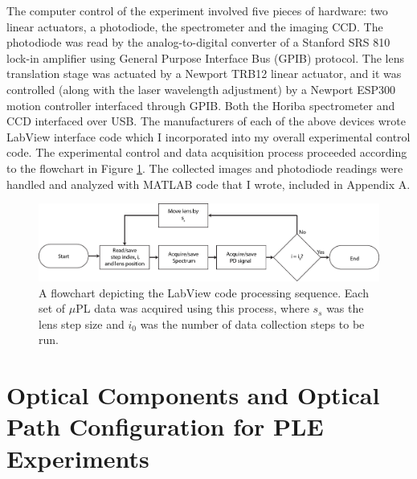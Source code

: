 \indent The computer control of the experiment involved five pieces of hardware: two linear actuators, a photodiode, the spectrometer and the imaging CCD. The photodiode was read by the analog-to-digital converter of a Stanford SRS 810 lock-in amplifier using General Purpose Interface Bus (GPIB) protocol. The lens translation stage was actuated by a Newport TRB12 linear actuator, and it was controlled (along with the laser wavelength adjustment) by a Newport ESP300 motion controller interfaced through GPIB. Both the Horiba spectrometer and CCD interfaced over USB. The manufacturers of each of the above devices wrote LabView interface code which I incorporated into my overall experimental control code. The experimental control and data acquisition process proceeded according to the flowchart in Figure \ref{flowit}. The collected images and photodiode readings were handled and analyzed with MATLAB code that I wrote, included in Appendix A.




\begin{figure}[t]
\centering
\includegraphics[width = 1\textwidth]{softflow.png}
\caption{ \doublespacing A flowchart depicting the LabView code processing sequence. Each set of $\mu$PL data was acquired using this process, where $s_s$ was the lens step size and $i_0$ was the number of data collection steps to be run.}
\label{flowit}
\end{figure}

\section{Optical Components and Optical Path Configuration for PLE Experiments}

